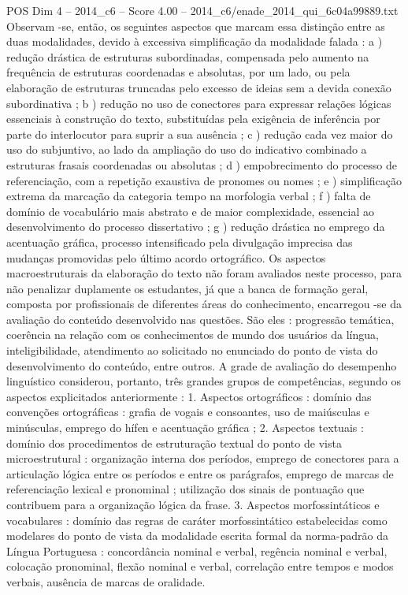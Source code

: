 \begin{textsample}{POS Dim 4 – 2014\_c6 – Score 4.00 – 2014\_c6/enade\_2014\_qui\_6c04a99889.txt}
Observam -se, então, os seguintes aspectos que marcam essa distinção entre as duas modalidades, devido à excessiva simplificação da modalidade falada : a ) redução drástica de estruturas subordinadas, compensada pelo aumento na frequência de estruturas coordenadas e absolutas, por um lado, ou pela elaboração de estruturas truncadas pelo excesso de ideias sem a devida conexão subordinativa ; b ) redução no uso de conectores para expressar relações lógicas essenciais à construção do texto, substituídas pela exigência de inferência por parte do interlocutor para suprir a sua ausência ; c ) redução cada vez maior do uso do subjuntivo, ao lado da ampliação do uso do indicativo combinado a estruturas frasais coordenadas ou absolutas ; d ) empobrecimento do processo de referenciação, com a repetição exaustiva de pronomes ou nomes ; e ) simplificação extrema da marcação da categoria tempo na morfologia verbal ; f ) falta de domínio de vocabulário mais abstrato e de maior complexidade, essencial ao desenvolvimento do processo dissertativo ; g ) redução drástica no emprego da acentuação gráfica, processo intensificado pela divulgação imprecisa das mudanças promovidas pelo último acordo ortográfico.
Os aspectos macroestruturais da elaboração do texto não foram avaliados neste processo, para não penalizar duplamente os estudantes, já que a banca de formação geral, composta por profissionais de diferentes áreas do conhecimento, encarregou -se da avaliação do conteúdo desenvolvido nas questões.
São eles : progressão temática, coerência na relação com os conhecimentos de mundo dos usuários da língua, inteligibilidade, atendimento ao solicitado no enunciado do ponto de vista do desenvolvimento do conteúdo, entre outros.
A grade de avaliação do desempenho linguístico considerou, portanto, três grandes grupos de competências, segundo os aspectos explicitados anteriormente : 1.
Aspectos ortográficos : domínio das convenções ortográficas : grafia de vogais e consoantes, uso de maiúsculas e minúsculas, emprego do hífen e acentuação gráfica ; 2.
Aspectos textuais : domínio dos procedimentos de estruturação textual do ponto de vista microestrutural : organização interna dos períodos, emprego de conectores para a articulação lógica entre os períodos e entre os parágrafos, emprego de marcas de referenciação lexical e pronominal ; utilização dos sinais de pontuação que contribuem para a organização lógica da frase. 3.
Aspectos morfossintáticos e vocabulares : domínio das regras de caráter morfossintático estabelecidas como modelares do ponto de vista da modalidade escrita formal da norma-padrão da Língua Portuguesa : concordância nominal e verbal, regência nominal e verbal, colocação pronominal, flexão nominal e verbal, correlação entre tempos e modos verbais, ausência de marcas de oralidade.

\end{textsample}
